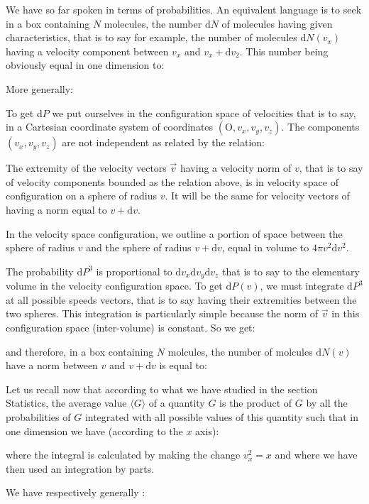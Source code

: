 	We have so far spoken in terms of probabilities. An equivalent language is to seek in a box containing $N$ molecules, the number $\mathrm{d}N$ of molecules having given characteristics, that is to say for example, the number of molecules $\mathrm{d}N(v_x)$ having a velocity component between $v_x$ and $v_x+\mathrm{d}v_2$. This number being obviously equal in one dimension to:
	
	More generally:
	
	To get $\mathrm{d}P$ we put ourselves in the configuration space of velocities that is to say, in a Cartesian coordinate system of coordinates $(\text{O},v_x,v_y,v_z)$. The components $(v_x,v_y,v_z)$ are not independent as related by the relation:
	
	The extremity of the velocity vectors $\vec{v}$ having a velocity norm of $v$, that is to say of velocity components bounded as the relation above, is in velocity space of configuration on a sphere of radius $v$. It will be the same for velocity vectors of having a norm equal to $v+\mathrm{d}v$.

	In the velocity space configuration, we outline a portion of space between the sphere of radius $v$ and the sphere of radius  $v+\mathrm{d}v$, equal in volume to $4\pi v^2\mathrm{d}v^2$.
	
	The probability $\mathrm{d}P^3$ is proportional to $\mathrm{d}v_x\mathrm{d}v_y\mathrm{d}v_z$ that is to say to the  elementary volume in the velocity configuration space. To get $\mathrm{d}P(v)$, we must integrate $\mathrm{d}P^3$ at all possible speeds vectors, that is to say having their extremities between the two spheres. This integration is particularly simple because the norm of $\vec{v}$ in this configuration space (inter-volume) is constant. So we get:
	
	and therefore, in a box containing $N$ molcules, the number of molcules $\mathrm{d}N(v)$ have a norm between $v$ and $v+\mathrm{d}v$ is equal to:
	
	Let us recall now that according to what we have studied in the section Statistics, the average value $\langle G \rangle$ of a quantity $G$ is the product of $G$ by all the probabilities of $G$ integrated with all possible values of this quantity such that in one dimension we have (according to the $x$ axis):
	
	where the integral is calculated by making the change $v_x^2=x$ and where we have then used an integration by parts.	

	We have respectively generally :
	
